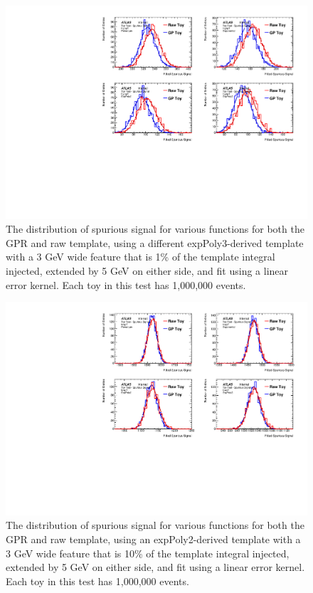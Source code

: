 \begin{figure} 
\begin{center}
  \includegraphics[width=\textwidth]{figures/background/gpr/validation/linear/ToyTest_FitSigVals_highpT_10k_Siginj}   
\caption{The distribution of spurious signal for various functions for both the GPR and raw template, using a different expPoly3-derived template with a 3 GeV wide feature that is 1\% of the template integral injected, extended by 5 GeV on either side, and fit using a linear error kernel. Each toy in this test has 1,000,000 events.}
\label{fig:linearkernel_highpt_10k_Siginj}
\end{center}
\end{figure}

\begin{figure}  
\begin{center}
  \includegraphics[width=\textwidth]{figures/background/gpr/validation/linear/ToyTest_FitSigVals_lowpT_100k_Siginj}   
\caption{The distribution of spurious signal for various functions for both the GPR and raw template, using an expPoly2-derived template with a 3 GeV wide feature that is 10\% of the template integral injected, extended by 5 GeV on either side, and fit using a linear error kernel. Each toy in this test has 1,000,000 events.}
\label{fig:linearkernel_lowpt_100k_Siginj}
\end{center}
\end{figure}

